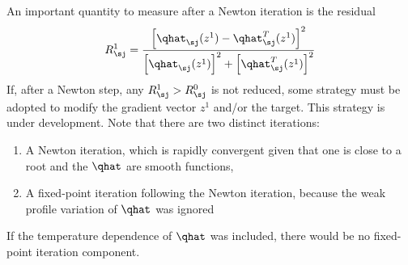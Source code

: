 %
An important quantity to measure after a Newton iteration is
the residual 
\begin{equation}
R^1_\sj = \frac{\left[\qhat_\sj(z^1)-\qhat^T_\sj(z^1)\right]^2}{
 \left[\qhat_\sj(z^1)\right]^2+\left[\qhat^T_\sj(z^1)\right]^2}
\end{equation}
%
If, after a Newton step, any $R^1_\sj > R^0_\sj$ is not 
reduced, some strategy must be adopted to modify the 
gradient vector $z^1$ and/or the target.  This strategy 
is under development.  Note that there are two distinct 
iterations: 
%
\begin{enumerate}
\item
A Newton iteration, which is rapidly convergent given 
that one is close to a root and the $\qhat$ are smooth 
functions, 
\item
A fixed-point iteration following the Newton iteration,
because the weak profile variation of $\qhat$ was 
ignored
\end{enumerate}
If the temperature dependence of $\qhat$ was included, there 
would be no fixed-point iteration component.